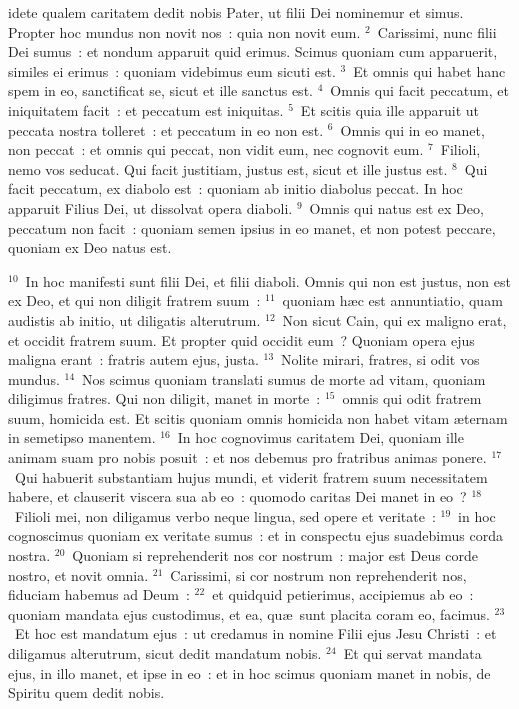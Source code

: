 \bchapter
{}idete qualem caritatem dedit nobis Pater, ut filii Dei nominemur et simus. Propter hoc mundus non novit nos~: quia non novit eum.
${}^{2}$~Carissimi, nunc filii Dei sumus~: et nondum apparuit quid erimus. Scimus quoniam cum apparuerit, similes ei erimus~: quoniam videbimus eum sicuti est.
${}^{3}$~Et omnis qui habet hanc spem in eo, sanctificat se, sicut et ille sanctus est.
${}^{4}$~Omnis qui facit peccatum, et iniquitatem facit~: et peccatum est iniquitas.
${}^{5}$~Et scitis quia ille apparuit ut peccata nostra tolleret~: et peccatum in eo non est.
${}^{6}$~Omnis qui in eo manet, non peccat~: et omnis qui peccat, non vidit eum, nec cognovit eum.
${}^{7}$~Filioli, nemo vos seducat. Qui facit justitiam, justus est, sicut et ille justus est.
${}^{8}$~Qui facit peccatum, ex diabolo est~: quoniam ab initio diabolus peccat. In hoc apparuit Filius Dei, ut dissolvat opera diaboli.
${}^{9}$~Omnis qui natus est ex Deo, peccatum non facit~: quoniam semen ipsius in eo manet, et non potest peccare, quoniam ex Deo natus est.


${}^{10}$~In hoc manifesti sunt filii Dei, et filii diaboli. Omnis qui non est justus, non est ex Deo, et qui non diligit fratrem suum~:
${}^{11}$~quoniam h\ae c est annuntiatio, quam audistis ab initio, ut diligatis alterutrum.
${}^{12}$~Non sicut Cain, qui ex maligno erat, et occidit fratrem suum. Et propter quid occidit eum~? Quoniam opera ejus maligna erant~: fratris autem ejus, justa.
${}^{13}$~Nolite mirari, fratres, si odit vos mundus.
${}^{14}$~Nos scimus quoniam translati sumus de morte ad vitam, quoniam diligimus fratres. Qui non diligit, manet in morte~:
${}^{15}$~omnis qui odit fratrem suum, homicida est. Et scitis quoniam omnis homicida non habet vitam \ae ternam in semetipso manentem.
${}^{16}$~In hoc cognovimus caritatem Dei, quoniam ille animam suam pro nobis posuit~: et nos debemus pro fratribus animas ponere.
${}^{17}$~Qui habuerit substantiam hujus mundi, et viderit fratrem suum necessitatem habere, et clauserit viscera sua ab eo~: quomodo caritas Dei manet in eo~?
${}^{18}$~Filioli mei, non diligamus verbo neque lingua, sed opere et veritate~:
${}^{19}$~in hoc cognoscimus quoniam ex veritate sumus~: et in conspectu ejus suadebimus corda nostra.
${}^{20}$~Quoniam si reprehenderit nos cor nostrum~: major est Deus corde nostro, et novit omnia.
${}^{21}$~Carissimi, si cor nostrum non reprehenderit nos, fiduciam habemus ad Deum~:
${}^{22}$~et quidquid petierimus, accipiemus ab eo~: quoniam mandata ejus custodimus, et ea, qu\ae\ sunt placita coram eo, facimus.
${}^{23}$~Et hoc est mandatum ejus~: ut credamus in nomine Filii ejus Jesu Christi~: et diligamus alterutrum, sicut dedit mandatum nobis.
${}^{24}$~Et qui servat mandata ejus, in illo manet, et ipse in eo~: et in hoc scimus quoniam manet in nobis, de Spiritu quem dedit nobis.

